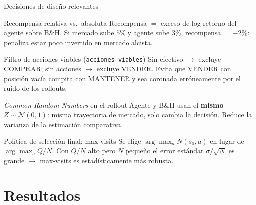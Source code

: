 \documentclass[aspectratio=169, 10pt]{beamer}
\begin{document}
\begin{frame}{Decisiones de diseño relevantes}
  \small
  \begin{block}{Recompensa relativa vs.\ absoluta}
    Recompensa $=$ exceso de log-retorno del agente sobre B\&H.
    Si mercado sube $5\%$ y agente sube $3\%$, recompensa $= -2\%$:
    penaliza estar poco invertido en mercado alcista.
  \end{block}

  \vspace{0.08cm}
  \begin{block}{Filtro de acciones viables (\texttt{acciones\_viables})}
    Sin efectivo $\to$ excluye COMPRAR; sin acciones $\to$ excluye VENDER.
    Evita que VENDER con posición vacía compita con MANTENER y sea
    coronada erróneamente por el ruido de los rollouts.
  \end{block}

  \vspace{0.08cm}
  \begin{block}{\emph{Common Random Numbers} en el rollout}
    Agente y B\&H usan el \textbf{mismo} $Z\sim\mathcal{N}(0,1)$:
    misma trayectoria de mercado, solo cambia la decisión.
    Reduce la varianza de la estimación comparativa.
  \end{block}

  \vspace{0.08cm}
  \begin{block}{Política de selección final: max-visits}
    Se elige $\arg\max_a N(s_0,a)$ en lugar de $\arg\max_a Q/N$.
    Con $Q/N$ alto pero $N$ pequeño el error estándar $\sigma/\sqrt{N}$ es grande
    $\to$ max-visits es estadísticamente más robusta.
  \end{block}
\end{frame}

\section{Resultados}
\end{document}
